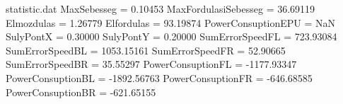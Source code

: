 \begin{filecontents*}{statistic.dat}
MaxSebesseg =    0.10453
MaxFordulasiSebesseg =   36.69119
Elmozdulas =    1.26779
Elfordulas =   93.19874
PowerConsuptionEPU =        NaN
SulyPontX =    0.30000
SulyPontY =    0.20000
SumErrorSpeedFL =  723.93084
SumErrorSpeedBL = 1053.15161
SumErrorSpeedFR =   52.90665
SumErrorSpeedBR =   35.55297
PowerConsuptionFL = -1177.93347
PowerConsuptionBL = -1892.56763
PowerConsuptionFR = -646.68585
PowerConsuptionBR = -621.65155
\end{filecontents*}
